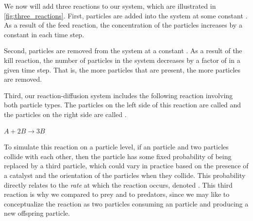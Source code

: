 \begin{qbox}\end{qbox}

We now will add three reactions to our system, which are illustrated in \autoref{fig:three_reactions}. First,  particles are added into the system at some constant  . As a result of the feed reaction, the concentration of the  particles increases by a constant in each time step.\\

\begin{note}\end{note}

Second,  particles are removed from the system at a constant  . As a result of the kill reaction, the number of  particles in the system decreases by a factor of  in a given time step. That is, the more  particles that are present, the more  particles are removed.

Third, our reaction-diffusion system includes the following reaction involving both particle types. The particles on the left side of this reaction are called  and the particles on the right side are called .

\begin{center}
$A + 2B \rightarrow 3B$
\end{center}

\noindent To simulate this reaction on a particle level, if an  particle and two  particles collide with each other, then the  particle has some fixed probability of being replaced by a third  particle, which could vary in practice based on the presence of a catalyst and the orientation of the particles when they collide. This probability directly relates to the \textit{rate} at which the reaction occurs, denoted . This third reaction is why we compared  to prey and  to predators, since we may like to conceptualize the reaction as two  particles consuming an  particle and producing a new offspring  particle.\\

